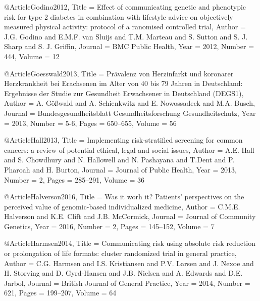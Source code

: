 @Article{Godino2012,
  Title                    = {Effect of communicating genetic and phenotypic risk for type 2 diabetes in combination with lifestyle advice on objectively measured physical activity: protocol of a ranomised controlled trial},
  Author                   = {J.G. Godino and E.M.F. van Sluijs and T.M. Marteau and S. Sutton and S. J. Sharp and S. J. Griffin},
  Journal                  = {BMC Public Health},
  Year                     = {2012},
  Number                   = {444},
  Volume                   = {12}
}

@Article{Goesswald2013,
  Title                    = {Prävalenz von Herzinfarkt und koronarer Herzkrankheit bei Erachsenen im Alter von 40 bis 79 Jahren in Deutschland: Ergebnisse der Studie zur Gesundheit Erwachsener in Deutschland (DEGS1)},
  Author                   = {A. Gößwald and A. Schienkwitz and E. Nowossadeck and M.A. Busch},
  Journal                  = {Bundesgesundheitsblatt Gesundheitsforschung Gesundheitschutz},
  Year                     = {2013},
  Number                   = {5-6},
  Pages                    = {650--655},
  Volume                   = {56}
}

@Article{Hall2013,
  Title                    = {Implementing risk-stratified screening for common cancers: a review of potential ethical, legal and social issues},
  Author                   = {A.E. Hall and S. Chowdhury and N. Hallowell and N. Pashayana and T.Dent and P. Pharoah and H. Burton},
  Journal                  = {Journal of Public Health},
  Year                     = {2013},
  Number                   = {2},
  Pages                    = {285--291},
  Volume                   = {36}
}

@Article{Halverson2016,
  Title                    = {Was it worh it? Patients' perspectives on the perceived value of genomic-based individualized medicine},
  Author                   = {C.M.E. Halverson and K.E. Clift and J.B. McCormick},
  Journal                  = {Journal of Community Genetics},
  Year                     = {2016},
  Number                   = {2},
  Pages                    = {145--152},
  Volume                   = {7}
}

@Article{Harmsen2014,
  Title                    = {Communicating risk using absolute risk reduction or prolongation of life formats: cluster randomized trial in general practice},
  Author                   = {C.G. Harmsen and I.S. Kristiansen and P.V. Larsen and J. Nexoe and H. Storving and D. Gyrd-Hansen and J.B. Nielsen and A. Edwards and D.E. Jarbol},
  Journal                  = {British Journal of General Practice},
  Year                     = {2014},
  Number                   = {621},
  Pages                    = {199--207},
  Volume                   = {64}
}

